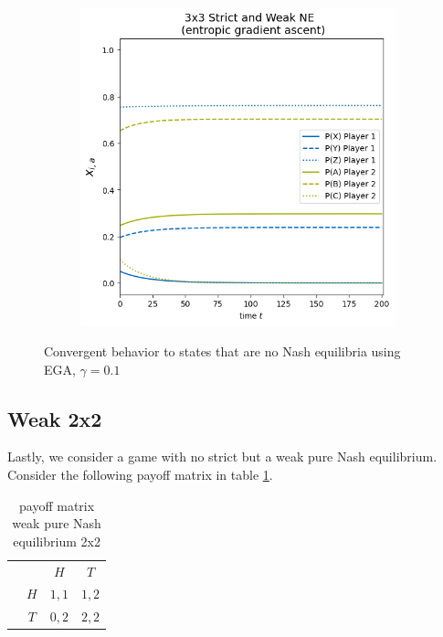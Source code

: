 \begin{figure}[H]
\begin{subfigure}{.5\textwidth}
    \includegraphics[width=\textwidth]{logos/Weak3x3-2b.png}
\end{subfigure}
\caption{Convergent behavior to states that are no Nash equilibria using EGA, $\gamma = 0.1$}
\label{fig:Weak3x3-2}
\end{figure}

\subsection{Weak 2x2}\label{subsection:Weak 2x2}

Lastly, we consider a game with no strict but a weak pure Nash equilibrium. Consider the following payoff matrix in table \ref{tab:payoffWeak2x2}. 

\begin{table}[H]\centering
\setlength{\extrarowheight}{2pt}
\begin{tabular}{cc|c|c|}
  & \multicolumn{1}{c}{} & \multicolumn{1}{c}{$H$}  & \multicolumn{1}{c}{$T$} \\\cline{3-4}
  & $H$ & $1,1$ & $1,2$ \\\cline{3-4}
  & $T$ & $0,2$ & $2,2$ \\\cline{3-4}
\end{tabular}\caption{\label{tab:payoffWeak2x2}payoff matrix weak pure Nash equilibrium 2x2}
\end{table}

